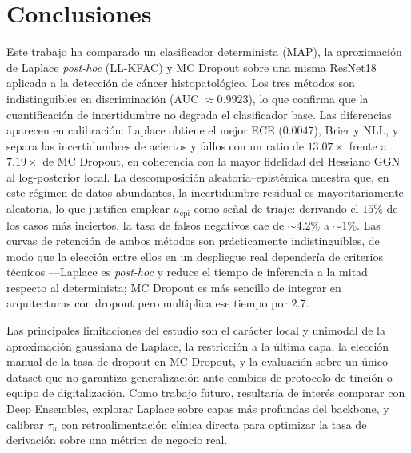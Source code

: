 \documentclass{article}
\begin{document}

\section{Conclusiones}
\label{sec:conclusions}

Este trabajo ha comparado un clasificador determinista (MAP), la
aproximaci\'on de Laplace \emph{post-hoc} (LL-KFAC) y MC Dropout sobre
una misma ResNet18 aplicada a la detecci\'on de c\'ancer histopatol\'ogico.
Los tres m\'etodos son indistinguibles en discriminaci\'on (AUC
$\approx\!0{.}9923$), lo que confirma que la cuantificaci\'on de
incertidumbre no degrada el clasificador base. Las diferencias aparecen
en calibraci\'on: Laplace obtiene el mejor ECE ($0{.}0047$), Brier y
NLL, y separa las incertidumbres de aciertos y fallos con un ratio de
$13{.}07\times$ frente a $7{.}19\times$ de MC Dropout, en coherencia
con la mayor fidelidad del Hessiano GGN al log-posterior local.
La descomposici\'on aleatoria--epist\'emica muestra que, en este
r\'egimen de datos abundantes, la incertidumbre residual es
mayoritariamente aleatoria, lo que justifica emplear $u_{\mathrm{epi}}$
como se\~nal de triaje: derivando el $15\%$ de los casos m\'as inciertos,
la tasa de falsos negativos cae de ${\sim}4{.}2\%$ a ${\sim}1\%$.
Las curvas de retenci\'on de ambos m\'etodos son pr\'acticamente
indistinguibles, de modo que la elecci\'on entre ellos en un
despliegue real depender\'ia de criterios t\'ecnicos ---Laplace es
\emph{post-hoc} y reduce el tiempo de inferencia a la mitad respecto
al determinista; MC Dropout es m\'as sencillo de integrar en
arquitecturas con dropout pero multiplica ese tiempo por $2{.}7$.
 
Las principales limitaciones del estudio son el car\'acter local y unimodal
de la aproximaci\'on gaussiana de Laplace, la restricci\'on a la \'ultima
capa, la elecci\'on manual de la tasa de dropout en MC Dropout, y
la evaluaci\'on sobre un \'unico dataset que no garantiza generalizaci\'on
ante cambios de protocolo de tinci\'on o equipo de digitalizaci\'on. Como
trabajo futuro, resultar\'ia de inter\'es comparar con Deep Ensembles,
explorar Laplace sobre capas m\'as profundas del backbone, y calibrar
$\tau_{u}$ con retroalimentaci\'on cl\'inica directa para optimizar la
tasa de derivaci\'on sobre una m\'etrica de negocio real.
\end{document}
